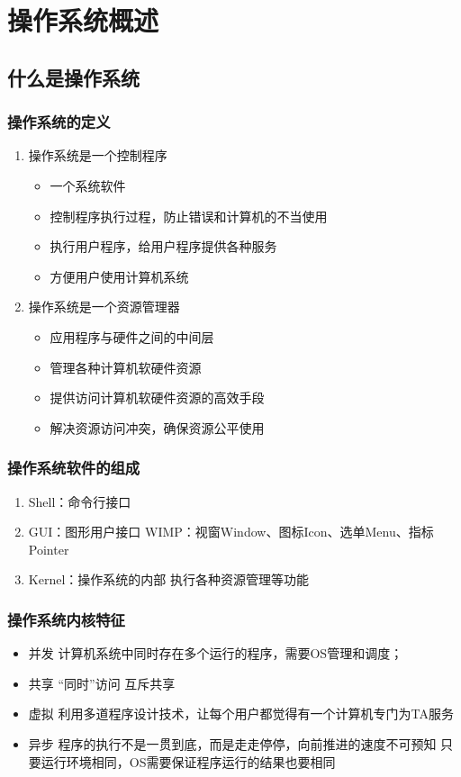 \chapter{操作系统概述}
\section{什么是操作系统}
\subsection{操作系统的定义}
\begin{enumerate}
\item 操作系统是一个控制程序
	\begin{itemize}
		\item 一个系统软件
		\item 控制程序执行过程，防止错误和计算机的不当使用
		\item 执行用户程序，给用户程序提供各种服务
		\item 方便用户使用计算机系统
	\end{itemize}
\item 操作系统是一个资源管理器
	\begin{itemize}
		\item 应用程序与硬件之间的中间层
		\item 管理各种计算机软硬件资源
		\item 提供访问计算机软硬件资源的高效手段
		\item 解决资源访问冲突，确保资源公平使用
	\end{itemize}
\end{enumerate}
\subsection{操作系统软件的组成}
\begin{enumerate}
	\item Shell：命令行接口
	\item GUI：图形用户接口
	\subitem WIMP：视窗Window、图标Icon、选单Menu、指标Pointer
	\item Kernel：操作系统的内部
	\subitem 执行各种资源管理等功能
\end{enumerate}
\subsection{操作系统内核特征}
\begin{itemize}
	\item 并发
	\subitem 计算机系统中同时存在多个运行的程序，需要OS管理和调度；
	\item 共享
	\subitem “同时”访问
	\subitem 互斥共享
	\item 虚拟
	\subitem 利用多道程序设计技术，让每个用户都觉得有一个计算机专门为TA服务
	\item 异步
	\subitem 程序的执行不是一贯到底，而是走走停停，向前推进的速度不可预知
	\subitem 只要运行环境相同，OS需要保证程序运行的结果也要相同
\end{itemize}

